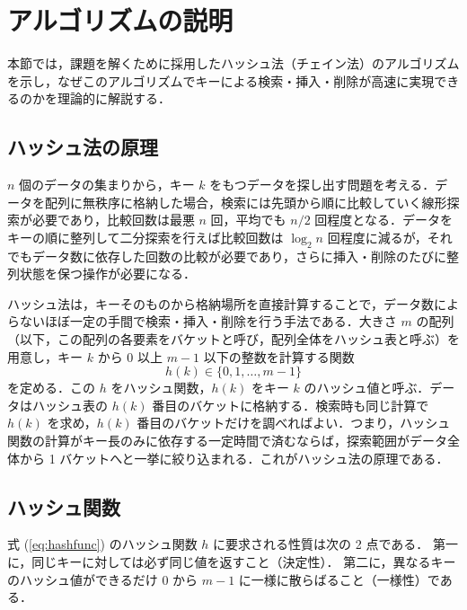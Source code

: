 \section{アルゴリズムの説明}

本節では，課題を解くために採用したハッシュ法（チェイン法）のアルゴリズムを示し，なぜこのアルゴリズムでキーによる検索・挿入・削除が高速に実現できるのかを理論的に解説する．

\subsection{ハッシュ法の原理}

$n$ 個のデータの集まりから，キー $k$ をもつデータを探し出す問題を考える．データを配列に無秩序に格納した場合，検索には先頭から順に比較していく線形探索が必要であり，比較回数は最悪 $n$ 回，平均でも $n/2$ 回程度となる．データをキーの順に整列して二分探索を行えば比較回数は $\log_2 n$ 回程度に減るが，それでもデータ数に依存した回数の比較が必要であり，さらに挿入・削除のたびに整列状態を保つ操作が必要になる．

ハッシュ法は，キーそのものから格納場所を直接計算することで，データ数によらないほぼ一定の手間で検索・挿入・削除を行う手法である．大きさ $m$ の配列（以下，この配列の各要素をバケットと呼び，配列全体をハッシュ表と呼ぶ）を用意し，キー $k$ から $0$ 以上 $m-1$ 以下の整数を計算する関数
\begin{equation}\label{eq:hashfunc}
h(k) \in \{0, 1, \ldots, m-1\}
\end{equation}
を定める．この $h$ をハッシュ関数，$h(k)$ をキー $k$ のハッシュ値と呼ぶ．データはハッシュ表の $h(k)$ 番目のバケットに格納する．検索時も同じ計算で $h(k)$ を求め，$h(k)$ 番目のバケットだけを調べればよい．つまり，ハッシュ関数の計算がキー長のみに依存する一定時間で済むならば，探索範囲がデータ全体から 1 バケットへと一挙に絞り込まれる．これがハッシュ法の原理である．

\subsection{ハッシュ関数}

式 (\ref{eq:hashfunc}) のハッシュ関数 $h$ に要求される性質は次の 2 点である．
第一に，同じキーに対しては必ず同じ値を返すこと（決定性）．
第二に，異なるキーのハッシュ値ができるだけ $0$ から $m-1$ に一様に散らばること（一様性）である．

